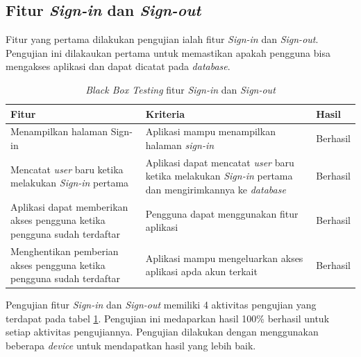 \subsection{Fitur \textit{Sign-in} dan \textit{Sign-out}}
Fitur yang pertama dilakukan pengujian ialah fitur \textit{Sign-in} dan \textit{Sign-out}. Pengujian ini dilakaukan pertama untuk memastikan apakah pengguna bisa mengakses aplikasi dan dapat dicatat pada \textit{database}.
\begin{table}[H]
	\centering
	\caption{\textit{Black Box Testing} fitur \textit{Sign-in} dan \textit{Sign-out}}
	\label{Tab:blackBoxSign}
	\begin{tabular}{|p{}|p{}|p{}|}
		\hline
		 \centering\textbf{Fitur} & \multicolumn{1}{m{0.45\textwidth}|}{\centering \textbf{Kriteria}}&  \multicolumn{1}{m{0.1\textwidth}|}{\centering \textbf{Hasil}}\\
		\hline
		Menampilkan halaman Sign-in 
		& Aplikasi mampu menampilkan halaman \textit{sign-in} 
		& Berhasil\\
		\hline
		Mencatat \textit{user} baru ketika melakukan \textit{Sign-in} pertama 
		& Aplikasi dapat mencatat \textit{user} baru ketika melakukan \textit{Sign-in} pertama dan mengirimkannya ke \textit{database}
		& Berhasil\\
		\hline
		Aplikasi dapat memberikan akses pengguna ketika pengguna sudah terdaftar
		& Pengguna dapat menggunakan fitur aplikasi
		& Berhasil\\
		\hline
		Menghentikan pemberian akses pengguna ketika pengguna sudah terdaftar
		& Aplikasi mampu mengeluarkan akses aplikasi apda akun terkait
		& Berhasil\\
		\hline
	\end{tabular}
\end{table}
Pengujian fitur \textit{Sign-in} dan \textit{Sign-out} memiliki 4 aktivitas pengujian yang terdapat pada tabel \ref*{Tab:blackBoxSign}.
Pengujian ini medaparkan hasil 100\% berhasil untuk setiap aktivitas pengujiannya. Pengujian dilakukan dengan menggunakan beberapa \textit{device} untuk mendapatkan hasil yang lebih baik.
\newpage
